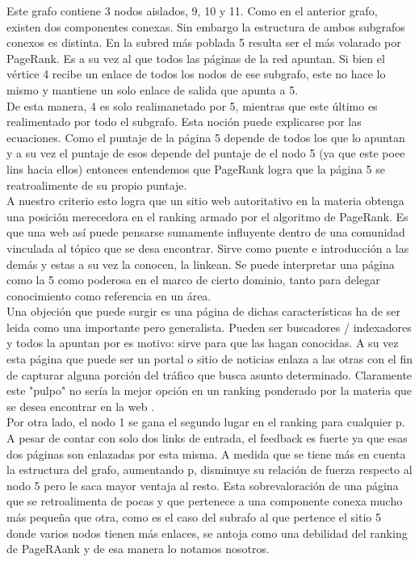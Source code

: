 Este grafo contiene 3 nodos aislados, 9, 10 y 11. Como en el anterior grafo, existen dos componentes conexas. Sin embargo la estructura de ambos subgrafos conexos es distinta. En la subred más poblada 5 resulta ser el más volarado por PageRank. Es a su vez al que todos las páginas de la red apuntan. Si bien el vértice 4 recibe un enlace de todos los nodos de ese subgrafo, este no hace lo mismo y mantiene un solo enlace de salida que apunta a 5. \\

De esta manera, 4 es solo realimanetado por 5, mientras que este último es realimentado por todo el subgrafo. Esta noción puede explicarse por las ecuaciones. Como el puntaje de la página 5 depende de todos los que lo apuntan y a su vez el puntaje de esos depende del puntaje de el nodo 5 (ya que este poee lins hacia ellos) entonces entendemos que PageRank logra que la página 5 se reatroalimente de su propio puntaje. \\

A nuestro criterio esto logra que un sitio web autoritativo en la materia obtenga una posición merecedora en el ranking armado por el algoritmo de PageRank. Es que una web así puede pensarse sumamente influyente dentro de una comunidad vinculada al tópico que se desa encontrar. Sirve como puente e introducción a las demás y estas a su vez la conocen, la linkean. Se puede interpretar una página como la 5 como poderosa en el marco de cierto dominio, tanto para delegar conocimiento como referencia en un área. \\

Una objeción que puede surgir es una página de dichas características ha de ser leida como una importante pero generalista. Pueden ser buscadores / indexadores y todos la apuntan por es motivo: sirve para que las hagan conocidas. A su vez esta página que puede ser un portal o sitio de noticias enlaza a las otras con el fin de capturar alguna porción del tráfico que busca asunto determinado. Claramente este "pulpo" no sería la mejor opción en un ranking ponderado por la materia que se desea encontrar en la web .\\

Por otra lado, el nodo 1 se gana el segundo lugar en el ranking para cualquier p. A pesar de contar con solo dos links de entrada, el feedback es fuerte ya que esas dos páginas son enlazadas por esta misma. A medida que se tiene más en cuenta la estructura del grafo, aumentando p, disminuye su relación de fuerza respecto al nodo 5 pero le saca mayor ventaja al resto.
Esta sobrevaloración de una página que se retroalimenta de pocas y que pertenece a una componente conexa mucho más pequeña que otra, como es el caso del subrafo al que pertence el sitio 5 donde varios nodos tienen más enlaces, se antoja como una debilidad del ranking de PageRAank y de esa manera lo notamos nosotros. \\

